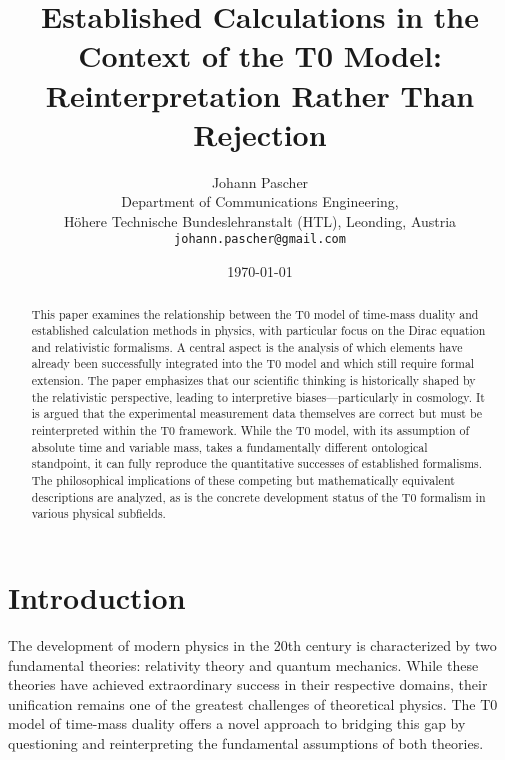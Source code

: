 \documentclass[12pt,a4paper]{article}
\begin{document}
	
	\title{Established Calculations in the Context of the T0 Model: \\Reinterpretation Rather Than Rejection}
	\author{Johann Pascher\\
		Department of Communications Engineering, \\Höhere Technische Bundeslehranstalt (HTL), Leonding, Austria\\
		\texttt{johann.pascher@gmail.com}}
	\date{\today}
	
	\maketitle
	
	\begin{abstract}
		This paper examines the relationship between the T0 model of time-mass duality and established calculation methods in physics, with particular focus on the Dirac equation and relativistic formalisms. A central aspect is the analysis of which elements have already been successfully integrated into the T0 model and which still require formal extension. The paper emphasizes that our scientific thinking is historically shaped by the relativistic perspective, leading to interpretive biases—particularly in cosmology. It is argued that the experimental measurement data themselves are correct but must be reinterpreted within the T0 framework. While the T0 model, with its assumption of absolute time and variable mass, takes a fundamentally different ontological standpoint, it can fully reproduce the quantitative successes of established formalisms. The philosophical implications of these competing but mathematically equivalent descriptions are analyzed, as is the concrete development status of the T0 formalism in various physical subfields.
	\end{abstract}
	
	\tableofcontents
	\newpage
	
	\section{Introduction}
	\label{sec:introduction}
	
	The development of modern physics in the 20th century is characterized by two fundamental theories: relativity theory and quantum mechanics. While these theories have achieved extraordinary success in their respective domains, their unification remains one of the greatest challenges of theoretical physics. The T0 model of time-mass duality offers a novel approach to bridging this gap by questioning and reinterpreting the fundamental assumptions of both theories.
	
\end{document}
